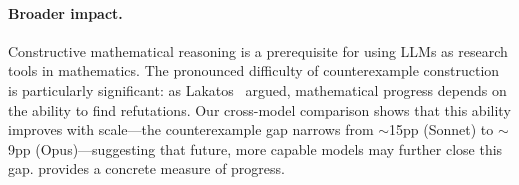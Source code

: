 \paragraph{Broader impact.}
Constructive mathematical reasoning is a prerequisite for using LLMs as research tools in mathematics.
The pronounced difficulty of counterexample construction is particularly significant: as Lakatos~\citep{lakatos1976proofs} argued, mathematical progress depends on the ability to find refutations.
Our cross-model comparison shows that this ability improves with scale---the counterexample gap narrows from ${\sim}$15pp (Sonnet) to ${\sim}$9pp (Opus)---suggesting that future, more capable models may further close this gap.
\ecagbench{} provides a concrete measure of progress.
